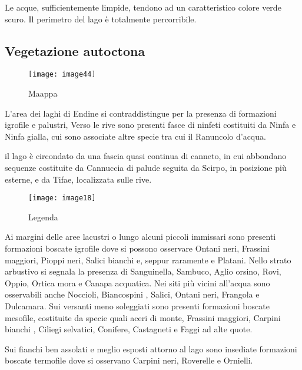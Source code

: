 Le acque, sufficientemente limpide, tendono ad un caratteristico colore verde scuro.
Il perimetro del lago è totalmente percorribile.

\subsection{Vegetazione autoctona}

\begin{wrapfigure}[9]{l}{0.4\textwidth}
	\centering
	\texttt{[image: image44]}
	\caption{Maappa}
\end{wrapfigure}


L’area dei laghi di Endine si contraddistingue per la presenza di formazioni igrofile e palustri, 
Verso le rive sono presenti fasce di ninfeti costituiti da Ninfa e Ninfa gialla, cui sono associate altre specie tra cui il Ranuncolo d’acqua.

il lago è circondato da una fascia quasi continua di canneto, in cui abbondano sequenze costituite da Cannuccia di palude seguita da Scirpo, in posizione più esterne, e da Tifae, localizzata sulle rive. 

\begin{wrapfigure}[15]{r}{0.3\textwidth}
	\centering
	\texttt{[image: image18]}
	\caption{Legenda}
\end{wrapfigure}



Ai margini delle aree lacustri o lungo alcuni piccoli immissari sono presenti formazioni boscate igrofile dove si possono osservare Ontani neri, Frassini maggiori, Pioppi neri, Salici bianchi e, seppur raramente e Platani. 
Nello strato arbustivo si segnala la presenza di Sanguinella, Sambuco, Aglio orsino, Rovi, Oppio, Ortica mora e Canapa acquatica. 
Nei siti più vicini all'acqua sono osservabili anche Noccioli, Biancospini , Salici, Ontani neri, Frangola e Dulcamara.
Sui versanti meno soleggiati sono presenti formazioni boscate mesofile, costituite da specie quali aceri di monte, Frassini maggiori, Carpini bianchi , Ciliegi selvatici, Conifere, Castagneti e Faggi ad alte quote. 

Sui fianchi ben assolati e meglio esposti attorno al lago sono insediate formazioni boscate termofile dove si osservano Carpini neri, Roverelle e Ornielli.

\pagebreak